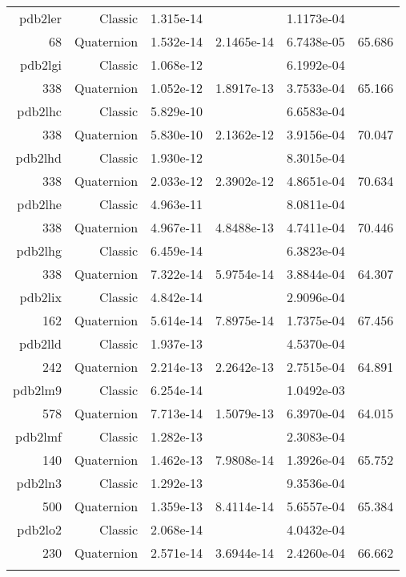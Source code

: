 \begin{xltabular}{\textwidth}{r|rS[table-format=1.3e+2]S[table-format=1.4e+2]S[table-format=1.4e+2]S[table-format=-1.3]}
pdb2ler & Classic & 1.315e-14 &  & 1.1173e-04 & \\
68 & Quaternion & 1.532e-14 & 2.1465e-14 & 6.7438e-05 & 65.686\\  \addlinespace
pdb2lgi & Classic & 1.068e-12 &  & 6.1992e-04 & \\
338 & Quaternion & 1.052e-12 & 1.8917e-13 & 3.7533e-04 & 65.166\\  \addlinespace
pdb2lhc & Classic & 5.829e-10 &  & 6.6583e-04 & \\
338 & Quaternion & 5.830e-10 & 2.1362e-12 & 3.9156e-04 & 70.047\\  \addlinespace
pdb2lhd & Classic & 1.930e-12 &  & 8.3015e-04 & \\
338 & Quaternion & 2.033e-12 & 2.3902e-12 & 4.8651e-04 & 70.634\\  \addlinespace
pdb2lhe & Classic & 4.963e-11 &  & 8.0811e-04 & \\
338 & Quaternion & 4.967e-11 & 4.8488e-13 & 4.7411e-04 & 70.446\\  \addlinespace
pdb2lhg & Classic & 6.459e-14 &  & 6.3823e-04 & \\
338 & Quaternion & 7.322e-14 & 5.9754e-14 & 3.8844e-04 & 64.307\\  \addlinespace
pdb2lix & Classic & 4.842e-14 &  & 2.9096e-04 & \\
162 & Quaternion & 5.614e-14 & 7.8975e-14 & 1.7375e-04 & 67.456\\  \addlinespace
pdb2lld & Classic & 1.937e-13 &  & 4.5370e-04 & \\
242 & Quaternion & 2.214e-13 & 2.2642e-13 & 2.7515e-04 & 64.891\\  \addlinespace
pdb2lm9 & Classic & 6.254e-14 &  & 1.0492e-03 & \\
578 & Quaternion & 7.713e-14 & 1.5079e-13 & 6.3970e-04 & 64.015\\  \addlinespace
pdb2lmf & Classic & 1.282e-13 &  & 2.3083e-04 & \\
140 & Quaternion & 1.462e-13 & 7.9808e-14 & 1.3926e-04 & 65.752\\  \addlinespace
pdb2ln3 & Classic & 1.292e-13 &  & 9.3536e-04 & \\
500 & Quaternion & 1.359e-13 & 8.4114e-14 & 5.6557e-04 & 65.384\\  \addlinespace
pdb2lo2 & Classic & 2.068e-14 &  & 4.0432e-04 & \\
230 & Quaternion & 2.571e-14 & 3.6944e-14 & 2.4260e-04 & 66.662\\  \addlinespace

\end{xltabular}
